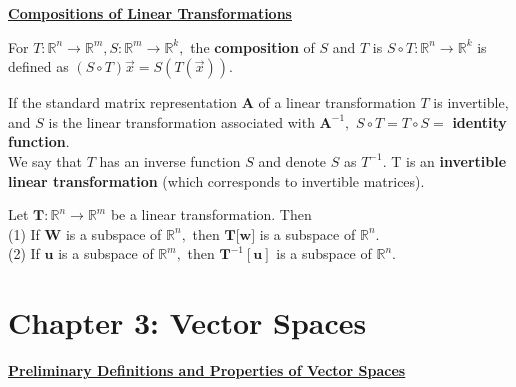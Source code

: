 \documentclass{article}
\begin{document}
\textbf{\underline{Compositions of Linear Transformations}} \\
\begin{definition}
For $T: \mathbb{R}^n \rightarrow \mathbb{R}^m, S: \mathbb{R}^m \rightarrow \mathbb{R}^k,$ the \textbf{composition} of $S$ and $T$ is
$ S\circ T : \mathbb{R}^n \rightarrow \mathbb{R}^k$ is defined as $(S \circ T)\vec{x} = S(T(\vec{x})).$
\end{definition}

\begin{definition}
If the standard matrix representation $\boldsymbol{A}$ of a linear transformation $T$ is invertible, and $S$ is the linear transformation associated with $\boldsymbol{A}^{-1},$ $S\circ T = T\circ S =$ \textbf{identity function}. \\

We say that $T$ has an inverse function $S$ and denote $S$ as $T^{-1}.$ T is an \textbf{invertible linear transformation} (which corresponds to invertible matrices).
\end{definition}

\begin{theorem}
Let $\textbf{T}: \mathbb{R}^n \rightarrow \mathbb{R}^m$ be a linear transformation. Then \\ 
(1) If $\textbf{W}$ is a subspace of $\mathbb{R}^n,$ then $\textbf{T[w]}$ is a subspace of $\mathbb{R}^n.$ \\ 
(2) If $\textbf{u}$ is a subspace of $\mathbb{R}^m,$ then $\textbf{T}^{-1}[\textbf{u}]$ is a subspace of $\mathbb{R}^n.$
\end{theorem}

\newpage

\section{Chapter 3: Vector Spaces}
\underline{\textbf{Preliminary Definitions and Properties of Vector Spaces}}
\end{document}

